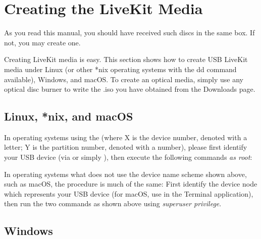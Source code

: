 \documentclass[a5paper,twosided,11pt]{book}
\begin{document}
    \section{Creating the LiveKit Media}
    
    As you read this manual, you should have received such discs in the same box.
    If not, you may create one.

    Creating LiveKit media is easy. This section shows how to create USB LiveKit media under Linux
    (or other *nix operating systems with the dd command available), Windows, and macOS.
    To create an optical media, simply use any optical disc burner to write the .iso you have obtained from the Downloads page.

    \subsection{Linux, *nix, and macOS}

    In operating systems using the  (where X is the device number, denoted with a letter;
    Y is the partition number, denoted with a number), please first identify your USB device (via  or simply ),
    then execute the following commands \textit{as root}:



    In operating systems what does not use the device name scheme shown above,
    such as macOS, the procedure is much of the same:
    First identify the device node which represents your USB device
    (for macOS, use  in the Terminal application),
    then run the two commands as shown above using \textit{superuser privilege}.

    \subsection{Windows}
\end{document}
